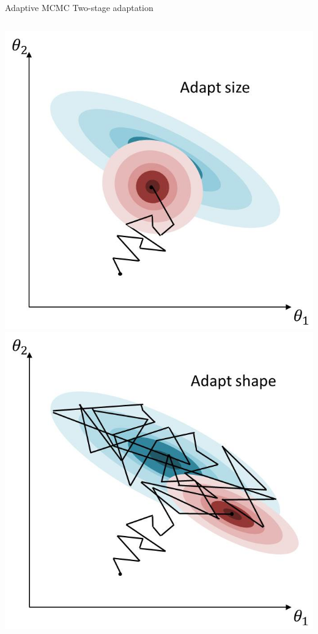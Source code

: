 \documentclass[compress]{beamer}
\begin{document}
\begin{frame}[label=sec-8-7]{Adaptive MCMC}
    Two-stage adaptation
    \begin{columns}[c] 
    \includegraphics[width=.8\linewidth]{MH7.jpg}
    \includegraphics[width=.8\linewidth]{MH8.jpg}
\end{columns}
\end{frame}
\end{document}
